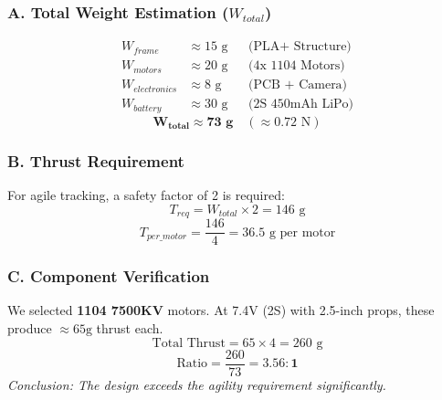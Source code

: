 \documentclass[12pt, a4paper]{article}
\begin{document}
\subsubsection{A. Total Weight Estimation ($W_{total}$)}
\begin{align*}
W_{frame} & \approx 15 \text{ g} && \text{(PLA+ Structure)} \\
W_{motors} & \approx 20 \text{ g} && \text{(4x 1104 Motors)} \\
W_{electronics} & \approx 8 \text{ g} && \text{(PCB + Camera)} \\
W_{battery} & \approx 30 \text{ g} && \text{(2S 450mAh LiPo)}
\end{align*}
\[
\mathbf{W_{total}} \approx \mathbf{73 \text{ g}} \quad (\approx 0.72 \text{ N})
\]

\subsubsection{B. Thrust Requirement}
For agile tracking, a safety factor of 2 is required:
\begin{equation}
T_{req} = W_{total} \times 2 = 146 \text{ g}
\end{equation}
\begin{equation}
T_{per\_motor} = \frac{146}{4} = 36.5 \text{ g per motor}
\end{equation}

\subsubsection{C. Component Verification}
We selected \textbf{1104 7500KV} motors. At 7.4V (2S) with 2.5-inch props, these produce $\approx 65\text{g}$ thrust each.
\begin{equation}
\text{Total Thrust} = 65 \times 4 = 260 \text{ g}
\end{equation}
\begin{equation}
\text{Ratio} = \frac{260}{73} = \mathbf{3.56 : 1}
\end{equation}
\textit{Conclusion: The design exceeds the agility requirement significantly.}
\end{document}
